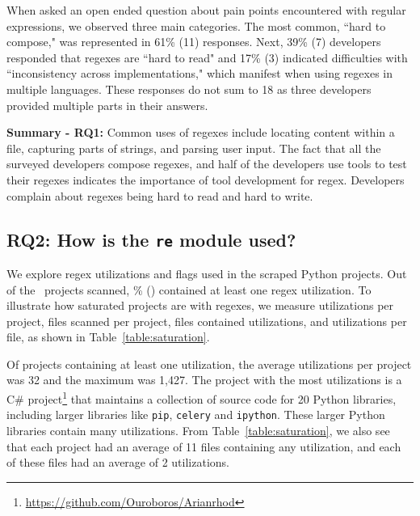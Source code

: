 When asked an open ended question about pain points encountered with regular expressions, we observed three main categories. The most common, ``hard to compose," was represented in 61\% (11) responses. Next,
 39\% (7) developers responded that regexes are ``hard to read" and 17\% (3) indicated difficulties with ``inconsistency across implementations," which manifest when using regexes in multiple languages. These responses do not sum to 18 as three developers provided multiple parts in their answers.

\vspace{6pt}
\textbf{Summary - RQ1:}
Common uses of regexes include locating content within a file, capturing parts of strings, and parsing user input.
The fact that all the surveyed developers compose regexes, and half of the developers use tools to test their regexes indicates the importance of tool development for regex.  Developers complain about regexes being hard to read and hard to write.



\subsection{RQ2: How  is the {\tt re} module used?}
We explore regex utilizations and flags used in the scraped Python projects.
Out of the \ projects scanned, \% () contained at least one regex utilization.  To illustrate how saturated projects are with regexes, we measure utilizations per project, files scanned per project, files contained utilizations, and  utilizations  per file, as shown in Table~\ref{table:saturation}.

Of projects containing at least one utilization, the average utilizations per project was 32 and the maximum  was 1,427.  The project with the most utilizations is a C\# project\footnote{\url{https://github.com/Ouroboros/Arianrhod}} that maintains a collection of source code for 20 Python libraries, including larger libraries like {\tt pip}, {\tt celery} and {\tt ipython}.  These larger Python libraries contain many utilizations.
From Table~\ref{table:saturation}, we also see that each project had an average of 11 files containing any utilization, and each of these files had an average of 2 utilizations.



